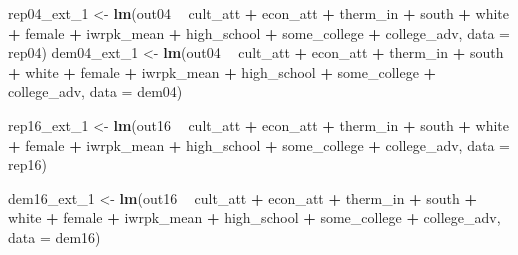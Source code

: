 \documentclass[
]{article}
\newenvironment{Shaded}{\begin{snugshade}}{\end{snugshade}}
\newcommand{\DataTypeTok}[1]{\textcolor[rgb]{0.13,0.29,0.53}{#1}}
\newcommand{\DecValTok}[1]{\textcolor[rgb]{0.00,0.00,0.81}{#1}}
\newcommand{\KeywordTok}[1]{\textcolor[rgb]{0.13,0.29,0.53}{\textbf{#1}}}
\newcommand{\NormalTok}[1]{#1}
\newcommand{\OperatorTok}[1]{\textcolor[rgb]{0.81,0.36,0.00}{\textbf{#1}}}
\newcommand{\StringTok}[1]{\textcolor[rgb]{0.31,0.60,0.02}{#1}}
\begin{document}
\begin{Shaded}
\begin{Highlighting}[]
\NormalTok{rep04_ext_}\DecValTok{1}\NormalTok{ <-}\StringTok{ }\KeywordTok{lm}\NormalTok{(out04 }\OperatorTok{~}\StringTok{ }\NormalTok{cult_att }\OperatorTok{+}\StringTok{ }\NormalTok{econ_att }\OperatorTok{+}\StringTok{ }\NormalTok{therm_in }\OperatorTok{+}
\StringTok{                                        }\NormalTok{south }\OperatorTok{+}\StringTok{ }\NormalTok{white }\OperatorTok{+}\StringTok{  }\NormalTok{female }\OperatorTok{+}
\StringTok{                                        }\NormalTok{iwrpk_mean }\OperatorTok{+}
\StringTok{                                        }\NormalTok{high_school }\OperatorTok{+}\StringTok{ }\NormalTok{some_college }\OperatorTok{+}\StringTok{ }\NormalTok{college_adv, }\DataTypeTok{data =}\NormalTok{ rep04)}
\NormalTok{dem04_ext_}\DecValTok{1}\NormalTok{ <-}\StringTok{ }\KeywordTok{lm}\NormalTok{(out04 }\OperatorTok{~}\StringTok{ }\NormalTok{cult_att }\OperatorTok{+}\StringTok{ }\NormalTok{econ_att }\OperatorTok{+}\StringTok{ }\NormalTok{therm_in }\OperatorTok{+}
\StringTok{                                        }\NormalTok{south }\OperatorTok{+}\StringTok{ }\NormalTok{white }\OperatorTok{+}\StringTok{ }\NormalTok{female }\OperatorTok{+}
\StringTok{                                        }\NormalTok{iwrpk_mean }\OperatorTok{+}
\StringTok{                                        }\NormalTok{high_school }\OperatorTok{+}\StringTok{ }\NormalTok{some_college }\OperatorTok{+}\StringTok{ }\NormalTok{college_adv, }\DataTypeTok{data =}\NormalTok{ dem04)}

\NormalTok{rep16_ext_}\DecValTok{1}\NormalTok{ <-}\StringTok{ }\KeywordTok{lm}\NormalTok{(out16 }\OperatorTok{~}\StringTok{ }\NormalTok{cult_att }\OperatorTok{+}\StringTok{ }\NormalTok{econ_att }\OperatorTok{+}\StringTok{ }\NormalTok{therm_in }\OperatorTok{+}
\StringTok{                                        }\NormalTok{south }\OperatorTok{+}\StringTok{ }\NormalTok{white }\OperatorTok{+}\StringTok{ }\NormalTok{female }\OperatorTok{+}
\StringTok{                                        }\NormalTok{iwrpk_mean }\OperatorTok{+}
\StringTok{                                        }\NormalTok{high_school }\OperatorTok{+}\StringTok{ }\NormalTok{some_college }\OperatorTok{+}\StringTok{ }\NormalTok{college_adv, }\DataTypeTok{data =}\NormalTok{ rep16)}

\NormalTok{dem16_ext_}\DecValTok{1}\NormalTok{ <-}\StringTok{ }\KeywordTok{lm}\NormalTok{(out16 }\OperatorTok{~}\StringTok{ }\NormalTok{cult_att }\OperatorTok{+}\StringTok{ }\NormalTok{econ_att }\OperatorTok{+}\StringTok{ }\NormalTok{therm_in }\OperatorTok{+}
\StringTok{                                        }\NormalTok{south }\OperatorTok{+}\StringTok{ }\NormalTok{white }\OperatorTok{+}\StringTok{ }\NormalTok{female }\OperatorTok{+}
\StringTok{                                        }\NormalTok{iwrpk_mean }\OperatorTok{+}
\StringTok{                                        }\NormalTok{high_school }\OperatorTok{+}\StringTok{ }\NormalTok{some_college }\OperatorTok{+}\StringTok{ }\NormalTok{college_adv, }\DataTypeTok{data =}\NormalTok{ dem16)}


\end{Highlighting}
\end{Shaded}
\end{document}
